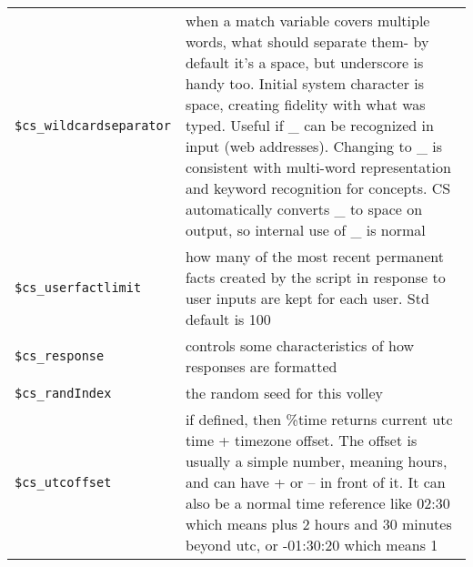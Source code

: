 \documentclass[]{article}
\begin{document}
\begin{longtable}[]{@{}ll@{}}
\begin{minipage}[t]{0.26\columnwidth}\raggedright\strut
\texttt{\$cs\_wildcardseparator}\strut
\end{minipage} & \begin{minipage}[t]{0.10\columnwidth}\raggedright\strut
when a match variable covers multiple words, what should separate them-
by default it's a space, but underscore is handy too. Initial system
character is space, creating fidelity with what was typed. Useful if \_
can be recognized in input (web addresses). Changing to \_ is consistent
with multi-word representation and keyword recognition for concepts. CS
automatically converts \_ to space on output, so internal use of \_ is
normal\strut
\end{minipage}\tabularnewline
\begin{minipage}[t]{0.26\columnwidth}\raggedright\strut
\texttt{\$cs\_userfactlimit}\strut
\end{minipage} & \begin{minipage}[t]{0.10\columnwidth}\raggedright\strut
how many of the most recent permanent facts created by the script in
response to user inputs are kept for each user. Std default is 100\strut
\end{minipage}\tabularnewline
\begin{minipage}[t]{0.26\columnwidth}\raggedright\strut
\texttt{\$cs\_response}\strut
\end{minipage} & \begin{minipage}[t]{0.10\columnwidth}\raggedright\strut
controls some characteristics of how responses are formatted\strut
\end{minipage}\tabularnewline
\begin{minipage}[t]{0.26\columnwidth}\raggedright\strut
\texttt{\$cs\_randIndex}\strut
\end{minipage} & \begin{minipage}[t]{0.10\columnwidth}\raggedright\strut
the random seed for this volley\strut
\end{minipage}\tabularnewline
\begin{minipage}[t]{0.26\columnwidth}\raggedright\strut
\texttt{\$cs\_utcoffset}\strut
\end{minipage} & \begin{minipage}[t]{0.10\columnwidth}\raggedright\strut
if defined, then \%time returns current utc time + timezone offset. The
offset is usually a simple number, meaning hours, and can have + or --
in front of it. It can also be a normal time reference like 02:30 which
means plus 2 hours and 30 minutes beyond utc, or -01:30:20 which means 1

\end{minipage}
\end{longtable}
\end{document}
